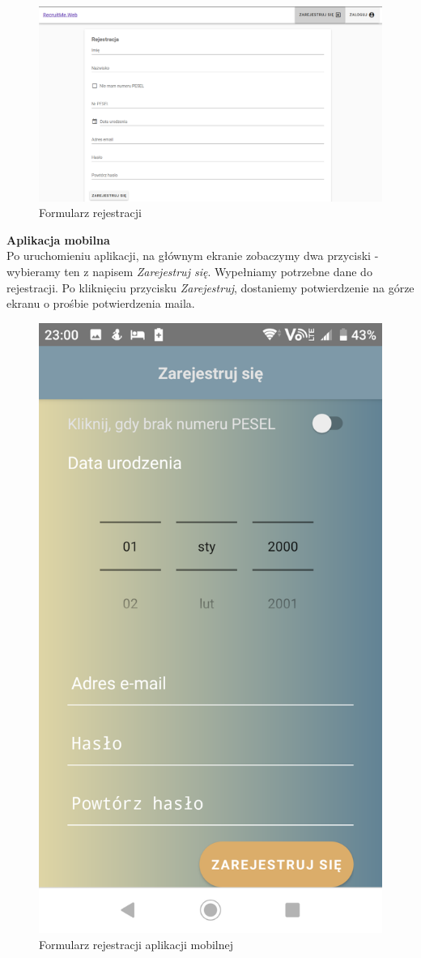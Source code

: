 \documentclass{article}
\begin{document}
\begin{figure}[H]
    \centering
    \includegraphics[width=1\linewidth]{images/web/register.png}
    \caption{Formularz rejestracji}
    \label{fig:test3_label}
\end{figure}

\textbf{Aplikacja mobilna} \\
Po uruchomieniu aplikacji, na głównym ekranie zobaczymy dwa przyciski - wybieramy ten z napisem \emph{Zarejestruj się}. Wypełniamy potrzebne dane do rejestracji. Po kliknięciu przycisku \emph{Zarejestruj}, dostaniemy potwierdzenie na górze ekranu o prośbie potwierdzenia maila.

\begin{figure}[H]
    \centering
    \includegraphics[width=0.45\linewidth]{images/mobile/register.png}
    \caption{Formularz rejestracji aplikacji mobilnej}
    \label{fig:test3_label}
\end{figure}
\end{document}

